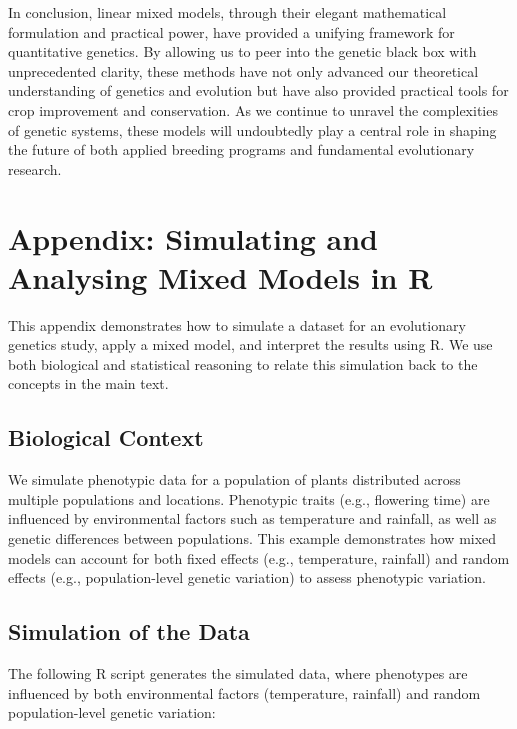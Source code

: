 \documentclass[12pt,a4paper]{article}
\begin{document}
In conclusion, linear mixed models, through their elegant mathematical formulation and practical power, have provided a unifying framework for quantitative genetics. By allowing us to peer into the genetic black box with unprecedented clarity, these methods have not only advanced our theoretical understanding of genetics and evolution but have also provided practical tools for crop improvement and conservation. As we continue to unravel the complexities of genetic systems, these models will undoubtedly play a central role in shaping the future of both applied breeding programs and fundamental evolutionary research.
\newpage


\appendix

\section{Appendix: Simulating and Analysing Mixed Models in R}

This appendix demonstrates how to simulate a dataset for an evolutionary genetics study, apply a mixed model, and interpret the results using R. We use both biological and statistical reasoning to relate this simulation back to the concepts in the main text.

\subsection{Biological Context}

We simulate phenotypic data for a population of plants distributed across multiple populations and locations. Phenotypic traits (e.g., flowering time) are influenced by environmental factors such as temperature and rainfall, as well as genetic differences between populations. This example demonstrates how mixed models can account for both fixed effects (e.g., temperature, rainfall) and random effects (e.g., population-level genetic variation) to assess phenotypic variation.

\subsection{Simulation of the Data}

The following R script generates the simulated data, where phenotypes are influenced by both environmental factors (temperature, rainfall) and random population-level genetic variation:
\end{document}
